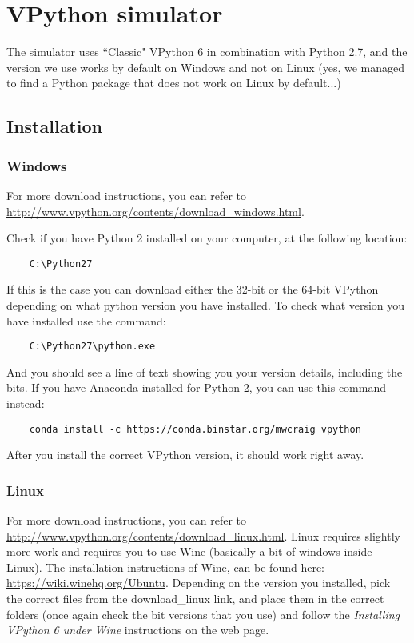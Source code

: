 \documentclass[10pt]{scrartcl}
\begin{document}
\section*{VPython simulator}
The simulator uses ``Classic" VPython 6 in combination with Python 2.7, and the version we use works by default on Windows and not on Linux (yes, we managed to find a Python package that does not work on Linux by default...)

\subsection*{Installation}
\subsubsection*{Windows}
For more download instructions, you can refer to \url{http://www.vpython.org/contents/download_windows.html}.

Check if you have Python 2 installed on your computer, at the following location:

\begin{verbatim}
    C:\Python27
\end{verbatim}
If this is the case you can download either the 32-bit or the 64-bit VPython depending on what python version you have installed. To check what version you have installed use the command:

\begin{verbatim}
    C:\Python27\python.exe
\end{verbatim}
And you should see a line of text showing you your version details, including the bits. If you have Anaconda installed for Python 2, you can use this command instead:

\begin{verbatim}
    conda install -c https://conda.binstar.org/mwcraig vpython
\end{verbatim}
After you install the correct VPython version, it should work right away.
\subsubsection*{Linux}
For more download instructions, you can refer to \url{http://www.vpython.org/contents/download_linux.html}.
Linux requires slightly more work and requires you to use Wine (basically a bit of windows inside Linux). The installation instructions of Wine, can be found here: \url{https://wiki.winehq.org/Ubuntu}. Depending on the version you installed, pick the correct files from the download\_linux link, and place them in the correct folders (once again check the bit versions that you use) and follow the \emph{Installing VPython 6 under Wine} instructions on the web page.
\end{document}
